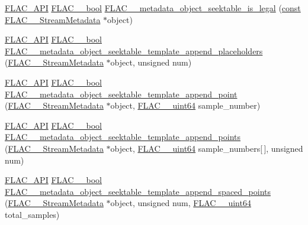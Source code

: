 \begin{DoxyCompactItemize}
\item 
\hyperlink{group__flac__export_ga56ca07df8a23310707732b1c0007d6f5}{F\+L\+A\+C\+\_\+\+A\+PI} \hyperlink{ordinals_8h_a95103469f1cbd78b8cf250194985b34e}{F\+L\+A\+C\+\_\+\+\_\+bool} \hyperlink{group__flac__metadata__object_ga08f33e2ef85d72363dda82de3208ed1e}{F\+L\+A\+C\+\_\+\+\_\+metadata\+\_\+object\+\_\+seektable\+\_\+is\+\_\+legal} (\hyperlink{zconf_8h_a2c212835823e3c54a8ab6d95c652660e}{const} \hyperlink{struct_f_l_a_c_____stream_metadata}{F\+L\+A\+C\+\_\+\+\_\+\+Stream\+Metadata} $\ast$object)
\item 
\hyperlink{group__flac__export_ga56ca07df8a23310707732b1c0007d6f5}{F\+L\+A\+C\+\_\+\+A\+PI} \hyperlink{ordinals_8h_a95103469f1cbd78b8cf250194985b34e}{F\+L\+A\+C\+\_\+\+\_\+bool} \hyperlink{group__flac__metadata__object_gae9d8c43dc78bde9778c4e57c5f74b025}{F\+L\+A\+C\+\_\+\+\_\+metadata\+\_\+object\+\_\+seektable\+\_\+template\+\_\+append\+\_\+placeholders} (\hyperlink{struct_f_l_a_c_____stream_metadata}{F\+L\+A\+C\+\_\+\+\_\+\+Stream\+Metadata} $\ast$object, unsigned num)
\item 
\hyperlink{group__flac__export_ga56ca07df8a23310707732b1c0007d6f5}{F\+L\+A\+C\+\_\+\+A\+PI} \hyperlink{ordinals_8h_a95103469f1cbd78b8cf250194985b34e}{F\+L\+A\+C\+\_\+\+\_\+bool} \hyperlink{group__flac__metadata__object_ga9ce1940ca29d71739316cf104256c078}{F\+L\+A\+C\+\_\+\+\_\+metadata\+\_\+object\+\_\+seektable\+\_\+template\+\_\+append\+\_\+point} (\hyperlink{struct_f_l_a_c_____stream_metadata}{F\+L\+A\+C\+\_\+\+\_\+\+Stream\+Metadata} $\ast$object, \hyperlink{ordinals_8h_aa78c8c70a3eb8a58af7436f278acde8e}{F\+L\+A\+C\+\_\+\+\_\+uint64} sample\+\_\+number)
\item 
\hyperlink{group__flac__export_ga56ca07df8a23310707732b1c0007d6f5}{F\+L\+A\+C\+\_\+\+A\+PI} \hyperlink{ordinals_8h_a95103469f1cbd78b8cf250194985b34e}{F\+L\+A\+C\+\_\+\+\_\+bool} \hyperlink{group__flac__metadata__object_gac27a59879fa8cdf47b75f8d73de82f0e}{F\+L\+A\+C\+\_\+\+\_\+metadata\+\_\+object\+\_\+seektable\+\_\+template\+\_\+append\+\_\+points} (\hyperlink{struct_f_l_a_c_____stream_metadata}{F\+L\+A\+C\+\_\+\+\_\+\+Stream\+Metadata} $\ast$object, \hyperlink{ordinals_8h_aa78c8c70a3eb8a58af7436f278acde8e}{F\+L\+A\+C\+\_\+\+\_\+uint64} sample\+\_\+numbers\mbox{[}$\,$\mbox{]}, unsigned num)
\item 
\hyperlink{group__flac__export_ga56ca07df8a23310707732b1c0007d6f5}{F\+L\+A\+C\+\_\+\+A\+PI} \hyperlink{ordinals_8h_a95103469f1cbd78b8cf250194985b34e}{F\+L\+A\+C\+\_\+\+\_\+bool} \hyperlink{group__flac__metadata__object_gab96c6585578c87f6853731860e2872e0}{F\+L\+A\+C\+\_\+\+\_\+metadata\+\_\+object\+\_\+seektable\+\_\+template\+\_\+append\+\_\+spaced\+\_\+points} (\hyperlink{struct_f_l_a_c_____stream_metadata}{F\+L\+A\+C\+\_\+\+\_\+\+Stream\+Metadata} $\ast$object, unsigned num, \hyperlink{ordinals_8h_aa78c8c70a3eb8a58af7436f278acde8e}{F\+L\+A\+C\+\_\+\+\_\+uint64} total\+\_\+samples)

\end{DoxyCompactItemize}

